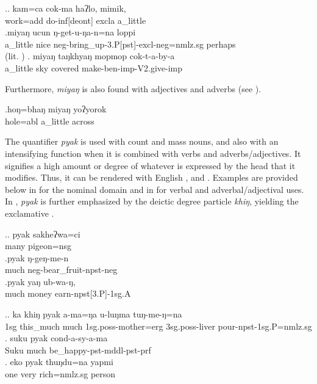 \ex.\ag. kam=ca cok-ma     haʔlo, mimik, \\
work{\sc =add} do{\sc -inf[deont]} {\sc excla} a\_little  \\
  
\bg.miyaŋ ucun ŋ-get-u-ŋa-n=na         loppi\\
a\_little nice {\sc neg-}bring\_up{\sc -3.P[pst]-excl-neg=nmlz.sg} perhaps\\
 (lit. )  
 \bg. miyaŋ taŋkhyaŋ mopmop  cok-t-a-by-a\\
a\_little  sky covered make{\sc -ben-imp-V2.give-imp}\\
  

 Furthermore, \emph{miyaŋ} is also found with adjectives and  adverbs (see \Next).
 
 \exg.hoŋ=bhaŋ   miyaŋ yoʔyorok\\
 hole{\sc =abl} a\_little across\\
  

The quantifier \emph{pyak} is used with count and mass nouns, and also with an intensifying function when it is combined with verbs and adverbs/adjectives. It signifies a high amount or degree of whatever is expressed by the head that it modifies. Thus, it can be rendered with  English ,  and . Examples are provided below in \Next for the nominal domain and in \NNext for verbal and adverbal/adjectival uses. In \NNext[a], \emph{pyak} is further emphasized by the deictic degree particle \emph{khiŋ}, yielding the exclamative .

\ex.\ag. pyak  sakheʔwa=ci\\
many pigeon{\sc =nsg}\\
 
\bg.pyak  ŋ-geŋ-me-n\\
much {\sc neg-}bear\_fruit{\sc [3sg]-npst-neg}\\
  
\bg.pyak  yaŋ  ub-wa-ŋ, \\
much money earn{\sc -npst[3.P]-1sg.A} \\
  

\ex.\ag.   ka  khiŋ     pyak  a-ma=ŋa   u-luŋma   tuŋ-me-ŋ=na\\
{\sc 1sg} this\_much much {\sc 1sg.poss-}mother{\sc =erg} {\sc 3sg.poss-}liver pour{\sc -npst-1sg.P=nmlz.sg}\\
  
\bg. suku   pyak  cond-a-sy-a-ma\\
Suku much be\_happy{\sc [3sg]-pst-mddl-pst-prf}\\
  
\bg.   eko pyak thuŋdu=na        yapmi\\
one very rich{\sc =nmlz.sg} person\\
  

